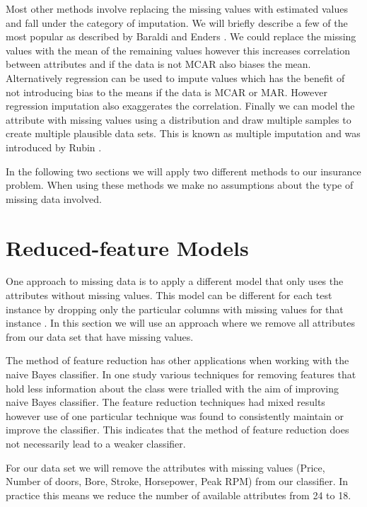 Most other methods involve replacing the missing values with estimated values and fall under the category of imputation.
We will briefly describe a few of the most popular as described by Baraldi and Enders \cite{Baraldi09}.
We could replace the missing values with the mean of the remaining values however this increases correlation between attributes and if the data is not MCAR also biases the mean.
Alternatively regression can be used to impute values which has the benefit of not introducing bias to the means if the data is MCAR or MAR.
However regression imputation also exaggerates the correlation.
Finally we can model the attribute with missing values using a distribution and draw multiple samples to create multiple plausible data sets.
This is known as multiple imputation and was introduced by Rubin \cite{Rubin87}.

In the following two sections we will apply two different methods to our insurance problem.
When using these methods we make no assumptions about the type of missing data involved.

\section{Reduced-feature Models}

One approach to missing data is to apply a different model that only uses the attributes without missing values. This model can be different for each test instance by dropping only the particular columns with missing values for that instance \cite{Saar-Tsechansky07}.
In this section we will use an approach where we remove all attributes from our data set that have missing values.

The method of feature reduction has other applications when working with the naive Bayes classifier.
In one study \cite{Novakovic10} various techniques for removing features that hold less information about the class were trialled with the aim of improving naive Bayes classifier.
The feature reduction techniques had mixed results however use of one particular technique was found to consistently maintain or improve the classifier.
This indicates that the method of feature reduction does not necessarily lead to a weaker classifier.

For our data set we will remove the attributes with missing values (Price, Number of doors, Bore, Stroke, Horsepower, Peak RPM) from our classifier.
In practice this means we reduce the number of available attributes from 24 to 18.

